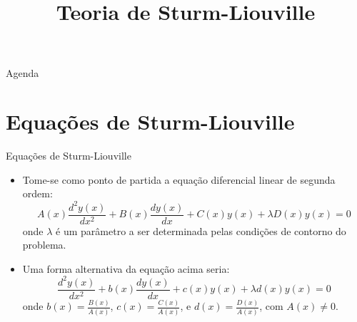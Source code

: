 


\title{\cursogrande\\ \vspace{1cm}Teoria de Sturm-Liouville}


   \maketitle[randomdots={false}]
   \begin{slide}{Agenda}
      \tableofcontents[content=sections]
   \end{slide}

   \section[ slide = true ]{Equações de Sturm-Liouville}
   \begin{slide}[toc=]{Equações de Sturm-Liouville}
		\begin{itemize}
			\item Tome-se como ponto de partida a equação diferencial linear de segunda ordem:
				\begin{equation*}
					A(x)\frac{d^2y(x)}{dx^2} + B(x)\frac{dy(x)}{dx}+ C(x)y(x)+\lambda D(x)y(x) = 0 
				\end{equation*}
					onde $\lambda$ é um parâmetro a ser determinada pelas condições de contorno do problema.
			\item Uma forma alternativa da equação acima seria:
				\begin{equation*}
					\frac{d^2y(x)}{dx^2} + b(x)\frac{dy(x)}{dx}+ c(x)y(x)+\lambda d(x)y(x) = 0 
				\end{equation*}
				onde $b(x) = \frac{B(x)}{A(x)}$, $c(x) = \frac{C(x)}{A(x)}$, e $d(x) = \frac{D(x)}{A(x)}$, com $A(x)\neq 0$.
		\end{itemize}
      \end{slide}
      

